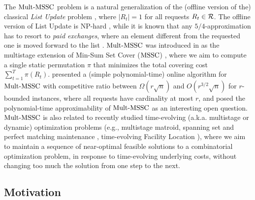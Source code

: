 The $\mathrm{Mult}\text{-}\mathrm{MSSC}$ problem is a natural generalization of the (offline version of the) classical \emph{List Update} problem \cite{ST85b}, where $|R_t| = 1$ for all requests $R_t \in \mathcal{R}$. The offline version of List Update is $\mathrm{NP}$-hard \cite{Amb00}, while it is known that any $5/4$-approximation has to resort to \emph{paid exchanges}, where an element different from the requested one is moved forward to the list \cite{LRR15,tim16}. $\mathrm{Mult}\text{-}\mathrm{MSSC}$ was introduced in \cite{FKKSV20} as the multistage extension of Min-Sum Set Cover ($\mathrm{MSSC}$) \cite{FLT04}, where we aim to compute a single static permutation $\pi$ that minimizes the total covering cost  $\sum_{t=1}^T \pi(R_t)$. \cite{FKKSV20} presented a (simple polynomial-time) online algorithm for $\mathrm{Mult}\text{-}\mathrm{MSSC}$ with competitive ratio between $\Omega(r \sqrt{n})$ and $O(r^{3/2} \sqrt{n})$ for $r$-bounded instances, where all requests have cardinality at most $r$, and posed the polynomial-time approximability of $\mathrm{Mult}\text{-}\mathrm{MSSC}$ as an interesting open question. $\mathrm{Mult}\text{-}\mathrm{MSSC}$ is also related to recently studied time-evolving (a.k.a. multistage or dynamic) optimization problems (e.g., multistage matroid, spanning set and perfect matching maintenance \cite{GTW14}, time-evolving Facility Location \cite{EMS14,Svensson15}), where we aim to maintain a sequence of near-optimal feasible solutions to a combinatorial optimization problem, in response to time-evolving underlying costs, without changing too much the solution from one step to the next. 

\subsection{Motivation}

